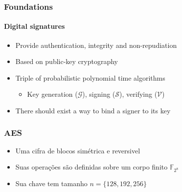 \documentclass[12pt]{beamer}
\newcommand{\concat}{\, \vert \vert \,}
\newcommand{\hash}[2][]{\mathcal{H}^{#1}(#2)}
\begin{document}
\begin{frame}
  \frametitle{Foundations}
  \framesubtitle{Digital signatures}
  \begin{itemize}
    \item Provide authentication, integrity and non-repudiation
    \item Based on public-key cryptography
    \item Triple of probabilistic polynomial time algorithms
      \cite{Goldreich2004}
    \begin{itemize}
      \item Key generation ($\mathcal{G}$), signing ($\mathcal{S}$),
          verifying ($\mathcal{V}$)
    \end{itemize}
    \item There should exist a way to bind a signer to its key
  \end{itemize}

  \begin{figure}
  \end{figure}
\end{frame}

\begin{frame}
    \frametitle{AES}
    \begin{itemize}
        \item Uma cifra de blocos simétrica e reversivel
        \item Suas operações são definidas sobre um corpo finito
        $\mathbb{F}_{2^{8}}$
        \item Sua chave tem tamanho $n = \{128,192,256 \}$
    \end{itemize}
    
\end{frame}
\end{document}
